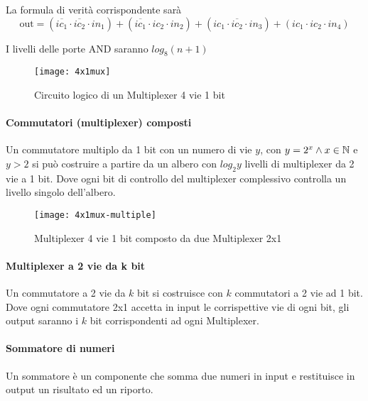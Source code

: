 La formula di verità corrispondente sarà
\[ \text{out} = (\overbar{ic_1} \cdot \overbar{ic_2} \cdot in_1) + (\overbar{ic_1} \cdot ic_2 \cdot in_2) + (ic_1 \cdot \overbar{ic_2} \cdot in_3) + (ic_1\cdot ic_2 \cdot in_4)  \]

I livelli delle porte AND saranno $ log_8(n+1) $

\begin{figure}
	\centering
	\texttt{[image: 4x1mux]}
	\caption{Circuito logico di un Multiplexer 4 vie 1 bit}
\end{figure}

\paragraph{Commutatori (multiplexer) composti}
Un commutatore multiplo da 1 bit con un numero di vie $ y $, con $ y = 2^x \land x \in \mathbb{N} $ e $ y > 2 $ si può costruire a partire da un albero con $ log_2y $ livelli di multiplexer da 2 vie a 1 bit. Dove ogni bit di controllo del multiplexer complessivo controlla un livello singolo dell'albero.

\begin{figure}
	\centering
	\texttt{[image: 4x1mux-multiple]}
	\caption{Multiplexer 4 vie 1 bit composto da due Multiplexer 2x1}
\end{figure}

\paragraph{Multiplexer a 2 vie da k bit}

Un commutatore a 2 vie da $ k $ bit si costruisce con $ k $ commutatori a 2 vie ad 1 bit. Dove ogni commutatore 2x1 accetta in input le corrispettive vie di ogni bit, gli output saranno i $ k $ bit corrispondenti ad ogni Multiplexer.



\paragraph{Sommatore di numeri}
Un sommatore è un componente che somma due numeri in input e restituisce in output un risultato ed un riporto.

